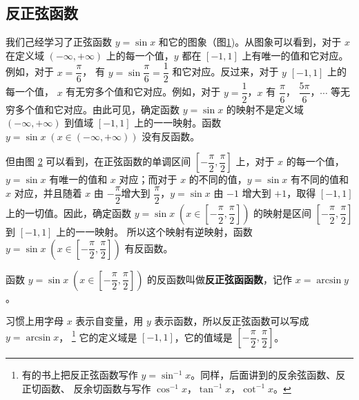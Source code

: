 \subsection{反正弦函数}\label{subsec:1-1}

我们己经学习了正弦函数 $y = \sin x$ 和它的图象（图\ref{fig:1-1})。从图象可以看到，对于 $x$ 在定义域
$(-\infty, +\infty)$ 上的每一个值，$y$ 都在 $[-1, 1]$ 上有唯一的值和它对应。例如，对于 $x = \dfrac{\pi}{6}$，\jiange
有 $y = \sin\dfrac{\pi}{6} = \dfrac{1}{2}$ 和它对应。反过来，对于 $y$ $[-1, 1]$ 上的每一个值，
$x$ 有无穷多个值和它对应。例如，对于 $y = \dfrac{1}{2}$\jiange，$x$ 有 $\dfrac{\pi}{6}$，\jiange
$\dfrac{5\pi}{6}$，$\cdots$ 等无穷多个值和它对应。由此可见，确定函数 $y = \sin x$ 的映射不是定义域 $(-\infty, +\infty)$
到值域 $[-1, 1]$ 上的一一映射。函数 $y = \sin x \; (x \in (-\infty, +\infty))$ 没有反函数。

\begin{figure}[htbp]
    \centering
    
    \caption{}\label{fig:1-1}
\end{figure}

但由图 \ref{fig:1-2} 可以看到，在正弦函数的单调区间 $\left[ -\dfrac{\pi}{2}, \dfrac{\pi}{2} \right]$\jiange
上，对于 $x$ 的每一个值，$y = \sin x$ 有唯一的值和 $x$ 对应；而对于 $x$ 的不同的值，$y = \sin x$
有不同的值和 $x$ 对应，并且随着 $x$ 由 $-\dfrac{\pi}{2}$\jiange 增大到 $\dfrac{\pi}{2}$，$y = \sin x$
由 $-1$ 增大到 $+1$，取得 $[-1, 1]$ 上的一切值。因此，确定函数
$y = \sin x \; \left( x \in \left[ -\dfrac{\pi}{2}, \dfrac{\pi}{2} \right]\right)$ \jiange
的映射是区间 $\left[ -\dfrac{\pi}{2}, \dfrac{\pi}{2} \right]$ \jiange 到 $[-1, 1]$ 上的一一映射。
所以这个映射有逆映射，函数
$y = \sin x \; \left( x \in \left[ -\dfrac{\pi}{2}, \dfrac{\pi}{2} \right]\right)$
有反函数。

\begin{figure}[htbp]
    \centering
    
    \caption{}\label{fig:1-2}
\end{figure}

函数
$y = \sin x \; \left( x \in \left[ -\dfrac{\pi}{2}, \dfrac{\pi}{2} \right]\right)$
的反函数叫做\textbf{反正弦函函数}，记作 $x = \arcsin y$。

\newpage
习惯上用字母 $x$ 表示自变量，用 $y$ 表示函数，所以反正弦函数可以写成 $y = \arcsin x$，
\footnote{有的书上把反正弦函数写作 $y = \sin^{-1}x$。同样，后面讲到的反余弦函数、反正切函数、
反余切函数与写作 $\cos^{-1}x$，$\tan^{-1}x$，$\cot^{-1}x$。}
它的定义域是 $[-1, 1]$，它的值域是 $\left[ -\dfrac{\pi}{2}, \dfrac{\pi}{2} \right]$。\jiange

